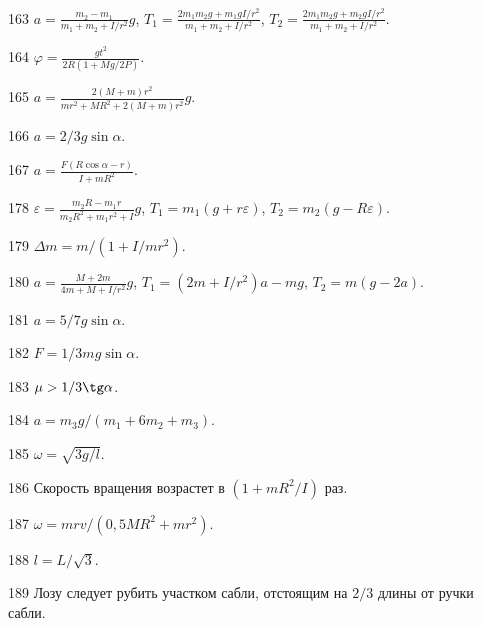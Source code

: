 \begin{Answer}{163}
$a= \frac{m_2-m_1}{m_1+m_2+I/r^2}g$, $T_1 = \frac{2m_1m_2g + m_1gI/r^2}{m_1+m_2+I/r^2}$, $T_2 = \frac{2m_1m_2g + m_2gI/r^2}{m_1+m_2+I/r^2}$.
\end{Answer}
\begin{Answer}{164}
$\varphi = \frac{gt^2}{2R(1+Mg/2P)}$.
\end{Answer}
\begin{Answer}{165}
$a = \frac{2(M+m)r^2}{mr^2+MR^2+2(M+m)r^2}g$.
\end{Answer}
\begin{Answer}{166}
$a=2/3g\sin \alpha$.
\end{Answer}
\begin{Answer}{167}
$a = \frac{F(R\cos \alpha - r)}{I + mR^2}$.
\end{Answer}
\begin{Answer}{178}
$\varepsilon = \frac{m_2R - m_1r}{m_2R^2 + m_1r^2 + I}g$, $T_1 = m_1(g+r\varepsilon)$, $T_2 = m_2(g-R\varepsilon)$.
\end{Answer}
\begin{Answer}{179}
$\Delta m = m/(1+I/mr^2)$.
\end{Answer}
\begin{Answer}{180}
$a = \frac{M+2m}{4m+M+I/r^2}g$, $T_1 = (2m+I/r^2)a - mg$, $T_2=m(g-2a)$.
\end{Answer}
\begin{Answer}{181}
$a=5/7g\sin \alpha$.
\end{Answer}
\begin{Answer}{182}
$F = 1/3 mg \sin \alpha$.
\end{Answer}
\begin{Answer}{183}
$\mu > 1/3 \tg \alpha$.
\end{Answer}
\begin{Answer}{184}
$a = m_3g/(m_1 + 6m_2 +m_3)$.
\end{Answer}
\begin{Answer}{185}
$\omega = \sqrt{3g/l}$.
\end{Answer}
\begin{Answer}{186}
Скорость вращения возрастет в $(1+mR^2/I)$ раз.
\end{Answer}
\begin{Answer}{187}
$\omega = mrv/(0,5MR^2 + mr^2)$.
\end{Answer}
\begin{Answer}{188}
$l = L/\sqrt{3}$.
\end{Answer}
\begin{Answer}{189}
Лозу следует рубить участком сабли, отстоящим на $2/3$ длины от ручки сабли.
\end{Answer}
